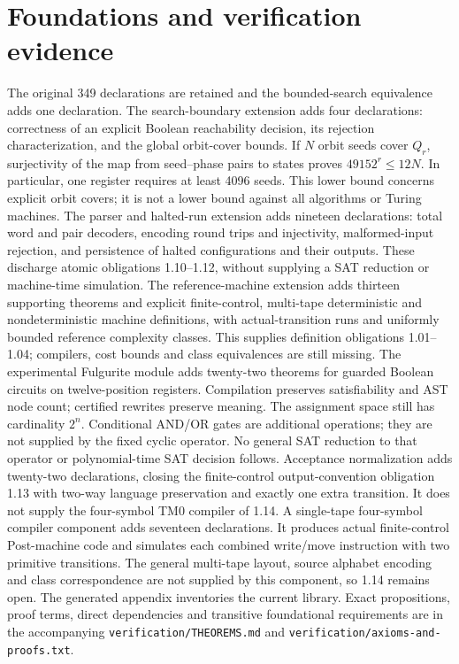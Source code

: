 \documentclass[11pt]{article}
\begin{document}
\section{Foundations and verification evidence}
The original 349 declarations are retained and the bounded-search equivalence
adds one declaration. The search-boundary extension adds four declarations: correctness of an explicit
Boolean reachability decision, its rejection characterization, and the global
orbit-cover bounds. If $N$ orbit seeds cover $Q_r$, surjectivity of the map from
seed--phase pairs to states proves $49152^r\leq12N$. In particular, one register
requires at least 4096 seeds. This lower bound concerns explicit orbit covers;
it is not a lower bound against all algorithms or Turing machines.
The parser and halted-run extension adds nineteen declarations: total word and
pair decoders, encoding round trips and injectivity, malformed-input rejection,
and persistence of halted configurations and their outputs. These discharge
atomic obligations 1.10--1.12, without supplying a SAT reduction or machine-time
simulation. The reference-machine extension adds thirteen supporting theorems and explicit
finite-control, multi-tape deterministic and nondeterministic machine definitions,
with actual-transition runs and uniformly bounded reference complexity classes.
This supplies definition obligations 1.01--1.04; compilers, cost bounds and
class equivalences are still missing. The experimental Fulgurite module adds twenty-two theorems for guarded Boolean
circuits on twelve-position registers. Compilation preserves satisfiability
and AST node count; certified rewrites preserve meaning. The assignment space
still has cardinality $2^n$. Conditional AND/OR gates are additional operations;
they are not supplied by the fixed cyclic operator. No general SAT reduction
to that operator or polynomial-time SAT decision follows. Acceptance normalization adds twenty-two declarations, closing the finite-control
output-convention obligation 1.13 with two-way language preservation and exactly
one extra transition. It does not supply the four-symbol TM0 compiler of 1.14.
A single-tape four-symbol compiler component adds seventeen declarations. It
produces actual finite-control Post-machine code and simulates each combined
write/move instruction with two primitive transitions. The general multi-tape
layout, source alphabet encoding and class correspondence are not supplied by
this component, so 1.14 remains open. The generated appendix inventories the current library.
Exact propositions, proof terms, direct dependencies and transitive foundational
requirements are in the accompanying \texttt{verification/THEOREMS.md} and
\texttt{verification/axioms-and-proofs.txt}.
\end{document}
